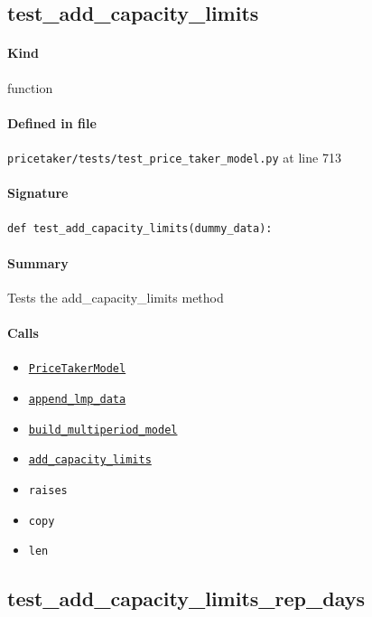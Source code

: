 \documentclass[11pt]{report}
\begin{document}
\subsection{test\_add\_capacity\_limits}
\label{def:pricetaker-tests-test_price_taker_model.py:test_add_capacity_limits:L713}
\paragraph{Kind} function
\paragraph{Defined in file} \texttt{pricetaker/tests/test\_price\_taker\_model.py} at line 713
\paragraph{Signature} \texttt{def test\_add\_capacity\_limits(dummy\_data):}
\paragraph{Summary} Tests the add\_capacity\_limits method
\paragraph{Calls}
\begin{itemize}[leftmargin=*]
  \item \hyperref[def:pricetaker-price_taker_model.py:PriceTakerModel:L161]{\texttt{PriceTakerModel}}
  \item \hyperref[def:pricetaker-price_taker_model.py:PriceTakerModel.append_lmp_data:L221]{\texttt{append\_lmp\_data}}
  \item \hyperref[def:pricetaker-price_taker_model.py:PriceTakerModel.build_multiperiod_model:L291]{\texttt{build\_multiperiod\_model}}
  \item \hyperref[def:pricetaker-price_taker_model.py:PriceTakerModel.add_capacity_limits:L654]{\texttt{add\_capacity\_limits}}
  \item \texttt{raises}
  \item \texttt{copy}
  \item \texttt{len}
\end{itemize}
\subsection{test\_add\_capacity\_limits\_rep\_days}
\label{def:pricetaker-tests-test_price_taker_model.py:test_add_capacity_limits_rep_days:L756}
\end{document}
